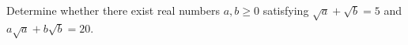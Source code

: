 Determine whether there exist real numbers $a,b\ge 0$ satisfying $\sqrt a+\sqrt b=5$ and $a\sqrt a+b\sqrt b=20$.
